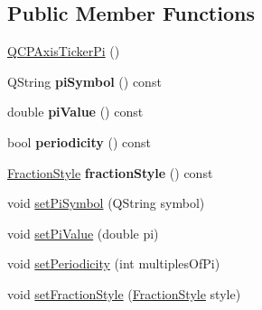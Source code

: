 \subsection*{Public Member Functions}
\begin{DoxyCompactItemize}
\item 
\hyperlink{classQCPAxisTickerPi_aa0d7b7034055927c0f0077a2d713d7d0}{Q\+C\+P\+Axis\+Ticker\+Pi} ()
\item 
\mbox{\label{classQCPAxisTickerPi_a2fd785cd66a6f4f969ac2eca1b08e0f2}} 
Q\+String {\bfseries pi\+Symbol} () const
\item 
\mbox{\label{classQCPAxisTickerPi_abddc18799caa4ae6c721e1e5e229b3a4}} 
double {\bfseries pi\+Value} () const
\item 
\mbox{\label{classQCPAxisTickerPi_aa320edf0a30386ce6a63c18050fbdfd8}} 
bool {\bfseries periodicity} () const
\item 
\mbox{\label{classQCPAxisTickerPi_ab532d5e838168a8a5bbafea4eafc94be}} 
\hyperlink{classQCPAxisTickerPi_a262f1534c7f0c79a7d5237f5d1e2c54c}{Fraction\+Style} {\bfseries fraction\+Style} () const
\item 
void \hyperlink{classQCPAxisTickerPi_acfdcd4758a393bde4be12a50fb2017b5}{set\+Pi\+Symbol} (Q\+String symbol)
\item 
void \hyperlink{classQCPAxisTickerPi_a36ce0651d2ec92edd36feac1619c2468}{set\+Pi\+Value} (double pi)
\item 
void \hyperlink{classQCPAxisTickerPi_a58f538dc01860fb56e46970e28a87f03}{set\+Periodicity} (int multiples\+Of\+Pi)
\item 
void \hyperlink{classQCPAxisTickerPi_a760c8af6ca68178e607556c4e5049d71}{set\+Fraction\+Style} (\hyperlink{classQCPAxisTickerPi_a262f1534c7f0c79a7d5237f5d1e2c54c}{Fraction\+Style} style)
\end{DoxyCompactItemize}
